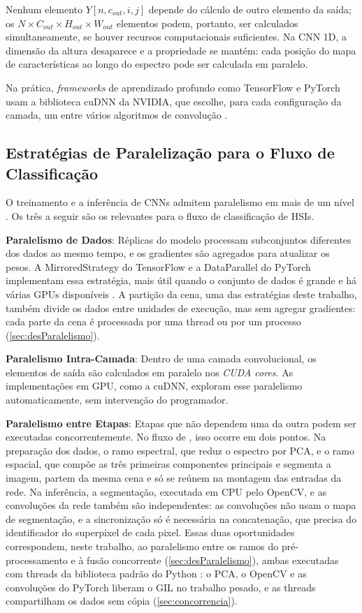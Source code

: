 Nenhum elemento $Y[n, c_{out}, i, j]$ depende do cálculo de outro elemento da saída; os $N \times C_{out} \times H_{out} \times W_{out}$ elementos podem, portanto, ser calculados simultaneamente, se houver recursos computacionais suficientes. Na CNN 1D, a dimensão da altura desaparece e a propriedade se mantém: cada posição do mapa de características ao longo do espectro pode ser calculada em paralelo.

Na prática, \textit{frameworks} de aprendizado profundo como TensorFlow e PyTorch usam a biblioteca cuDNN da NVIDIA, que escolhe, para cada configuração da camada, um entre vários algoritmos de convolução \cite{Jorda_cuDNN}.

\subsection{Estratégias de Paralelização para o Fluxo de Classificação}

O treinamento e a inferência de CNNs admitem paralelismo em mais de um nível \cite{Aach2025, Nandan10910577}. Os três a seguir são os relevantes para o fluxo de classificação de HSIs.

\textbf{Paralelismo de Dados}: Réplicas do modelo processam subconjuntos diferentes dos dados ao mesmo tempo, e os gradientes são agregados para atualizar os pesos. A MirroredStrategy do TensorFlow e a DataParallel do PyTorch implementam essa estratégia, mais útil quando o conjunto de dados é grande e há várias GPUs disponíveis \cite{Nandan10910577}. A partição da cena, uma das estratégias deste trabalho, também divide os dados entre unidades de execução, mas sem agregar gradientes: cada parte da cena é processada por uma thread ou por um processo (\autoref{sec:desParalelismo}).

\textbf{Paralelismo Intra-Camada}: Dentro de uma camada convolucional, os elementos de saída são calculados em paralelo nos \textit{CUDA cores}. As implementações em GPU, como a cuDNN, exploram esse paralelismo automaticamente, sem intervenção do programador.

\textbf{Paralelismo entre Etapas}: Etapas que não dependem uma da outra podem ser executadas concorrentemente. No fluxo de , isso ocorre em dois pontos. Na preparação dos dados, o ramo espectral, que reduz o espectro por PCA, e o ramo espacial, que compõe as três primeiras componentes principais e segmenta a imagem, partem da mesma cena e só se reúnem na montagem das entradas da rede. Na inferência, a segmentação, executada em CPU pelo OpenCV, e as convoluções da rede também são independentes: as convoluções não usam o mapa de segmentação, e a sincronização só é necessária na concatenação, que precisa do identificador do superpixel de cada pixel. Essas duas oportunidades correspondem, neste trabalho, ao paralelismo entre os ramos do pré-processamento e à fusão concorrente (\autoref{sec:desParalelismo}), ambas executadas com threads da biblioteca padrão do Python \cite{Python_Threading}: o PCA, o OpenCV e as convoluções do PyTorch liberam o GIL no trabalho pesado, e as threads compartilham os dados sem cópia (\autoref{sec:concorrencia}).

